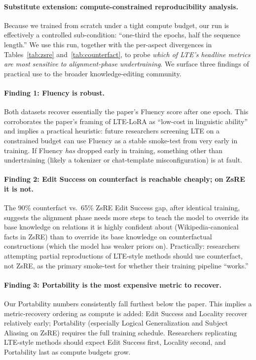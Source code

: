 \documentclass[11pt,a4paper,twocolumn]{article}
\begin{document}
\paragraph{Substitute extension: compute-constrained reproducibility analysis.} Because we trained from scratch under a tight compute budget, our run is effectively a controlled sub-condition: ``one-third the epochs, half the sequence length.'' We use this run, together with the per-aspect divergences in Tables~\ref{tab:zsre} and~\ref{tab:counterfact}, to probe \emph{which of LTE's headline metrics are most sensitive to alignment-phase undertraining}. We surface three findings of practical use to the broader knowledge-editing community.

\paragraph{Finding 1: Fluency is robust.} Both datasets recover essentially the paper's Fluency score after one epoch. This corroborates the paper's framing of LTE-LoRA as ``low-cost in linguistic ability'' and implies a practical heuristic: future researchers screening LTE on a constrained budget can use Fluency as a stable smoke-test from very early in training. If Fluency \emph{has} dropped early in training, something other than undertraining (likely a tokenizer or chat-template misconfiguration) is at fault.

\paragraph{Finding 2: Edit Success on counterfact is reachable cheaply; on ZsRE it is not.} The 90\% counterfact vs.\ 65\% ZsRE Edit Success gap, after identical training, suggests the alignment phase needs more steps to teach the model to override its base knowledge on relations it is highly confident about (Wikipedia-canonical facts in ZsRE) than to override its base knowledge on counterfactual constructions (which the model has weaker priors on). Practically: researchers attempting partial reproductions of LTE-style methods should use counterfact, not ZsRE, as the primary smoke-test for whether their training pipeline ``works.''

\paragraph{Finding 3: Portability is the most expensive metric to recover.} Our Portability numbers consistently fall furthest below the paper. This implies a metric-recovery ordering as compute is added: Edit Success and Locality recover relatively early; Portability (especially Logical Generalization and Subject Aliasing on ZsRE) requires the full training schedule. Researchers replicating LTE-style methods should expect Edit Success first, Locality second, and Portability last as compute budgets grow.
\end{document}
